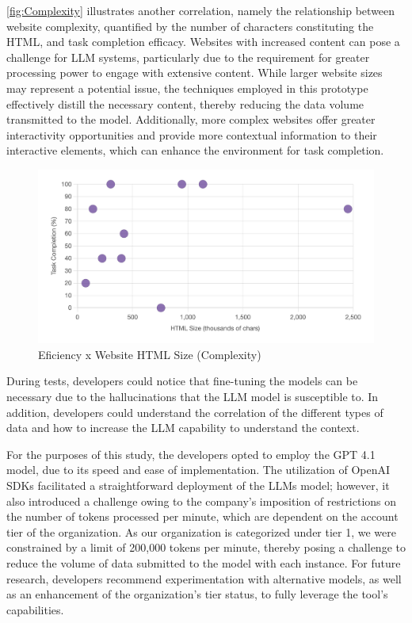 \documentclass[conference]{IEEEtran}
\begin{document}
\autoref{fig:Complexity} illustrates another correlation, namely the relationship between website complexity, quantified by the number of characters constituting the HTML, and task completion efficacy. Websites with increased content can pose a challenge for LLM systems, particularly due to the requirement for greater processing power to engage with extensive content. While larger website sizes may represent a potential issue, the techniques employed in this prototype effectively distill the necessary content, thereby reducing the data volume transmitted to the model. Additionally, more complex websites offer greater interactivity opportunities and provide more contextual information to their interactive elements, which can enhance the environment for task completion.
\begin{figure}[h]
    \centering
    \includegraphics[width=1\linewidth]{images/efficiencexcomplexity.png}
    \caption{Eficiency x Website HTML Size (Complexity)}
    \label{fig:Complexity}
\end{figure}

During tests, developers could notice that fine-tuning the models can be necessary due to the hallucinations that the LLM model is susceptible to. In addition, developers could understand the correlation of the different types of data and how to increase the LLM capability to understand the context. 

For the purposes of this study, the developers opted to employ the GPT 4.1 model, due to its speed and ease of implementation. The utilization of OpenAI SDKs facilitated a straightforward deployment of the LLMs model; however, it also introduced a challenge owing to the company's imposition of restrictions on the number of tokens processed per minute, which are dependent on the account tier of the organization. As our organization is categorized under tier 1, we were constrained by a limit of 200,000 tokens per minute, thereby posing a challenge to reduce the volume of data submitted to the model with each instance. For future research, developers recommend experimentation with alternative models, as well as an enhancement of the organization's tier status, to fully leverage the tool's capabilities.
\end{document}
